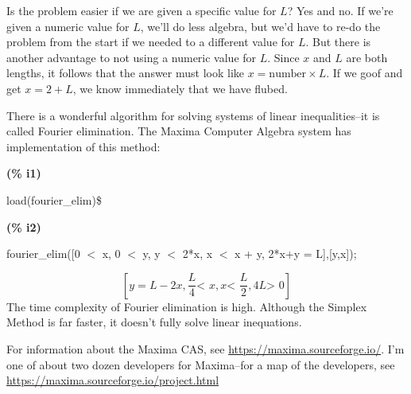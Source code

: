 \documentclass[12pt,fleqn,answers]{exam}
\begin{document}
\begin{questions}
\begin{solution}
\quad Is the problem easier if we are given a specific value for $L$?
Yes and no.  If we're given a numeric value for $L$, we'll do less
algebra, but we'd have to re-do the problem from the start if we 
needed to a different value for $L$. But there is another advantage 
to not using a numeric value for $L$.  Since $x$ and $L$ are both
lengths, it follows that the answer must look like $x = \mbox{number} \times L$.
If we goof and get $x = 2 + L$, we know immediately that we have flubed.



\quad There is a wonderful algorithm for solving systems of 
linear inequalities--it is called Fourier elimination. 
The Maxima Computer Algebra system has implementation of this method:

\noindent
\begin{minipage}[t]{8em}\color{red}\bf
(\% i1) 
\end{minipage}
\begin{minipage}[t]{\textwidth}\color{blue}
load(fourier\_elim)\$


\end{minipage}

\noindent%


\noindent
\begin{minipage}[t]{8em}\color{red}\bf
(\% i2)
\end{minipage}
\begin{minipage}[t]{\textwidth}\color{blue}
fourier\_elim([0 \ensuremath{<} x, 0 \ensuremath{<} y, y \ensuremath{<} 2*x, x \ensuremath{<} x + y, 2*x+y = L],[y,x]);


\end{minipage}
\[\displaystyle \tag{\% o2} 
[y=L-2 x,\frac{L}{4}\mbox{<  }x,x\mbox{<  }\frac{L}{2},4 L\mbox{>  }0]\mbox{}
\]
The time complexity of Fourier elimination is high. Although the
Simplex Method is far faster, it doesn't fully solve linear 
inequations.  

\quad For information about the Maxima CAS, see
\url{https://maxima.sourceforge.io/}. I'm one of
about two dozen developers for Maxima--for a map of
the developers, see \url{https://maxima.sourceforge.io/project.html}

\end{solution}

\end{questions}
\end{document}
